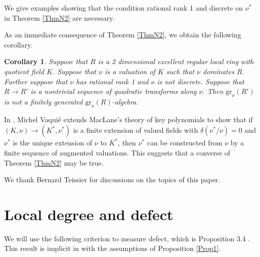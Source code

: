 \documentclass[11pt]{amsart}
\newtheorem{Corollary}[Theorem]{Corollary}
\begin{document}
We give  examples showing that the condition rational rank 1 and discrete on $\nu^*$ in Theorem \ref{ThmN2} are necessary.

As an immediate consequence of  Theorem \ref{ThmN2}, we obtain the following corollary.

\begin{Corollary}\label{CorN32}   Suppose that $R$ is a 2 dimensional excellent regular local ring with quotient field $K$. Suppose that $\nu$ is a valuation of $K$ such that 
 $\nu$ dominates $R$.        Further suppose that $\nu$ has rational rank 1 and $\nu$ is not discrete. Suppose that $R\rightarrow R'$ is a nontrivial sequence of quadratic transforms along $\nu$. Then
 $\mbox{gr}_{\nu}(R')$ is not a finitely generated $\mbox{gr}_{\nu}(R)$-algebra.
 \end{Corollary}
 
 In \cite{Vaq}, Michel Vaqui\'e extends MacLane's theory of key polynomials \cite{M} to show that if $(K,\nu)\rightarrow (K^*,\nu^*)$ is a finite extension of valued fields with $\delta(\nu^*/\nu)=0$ and $\nu^*$ is the unique extension of $\nu$ to $K^*$, then $\nu^*$ can be constructed from $\nu$ by a finite sequence of augmented valuations. This suggests that a converse of Theorem \ref{ThmN2} may be true.
 
 We thank Bernard Teissier for discussions on the topics of this paper.

\section{Local degree and defect}\label{SecLocDeg}


We will use the following criterion to measure defect, which is Proposition 3.4 \cite{C12}. This result is implicit in \cite{CP} with the assumptions of Proposition \ref{Prop1}.
\end{document}
